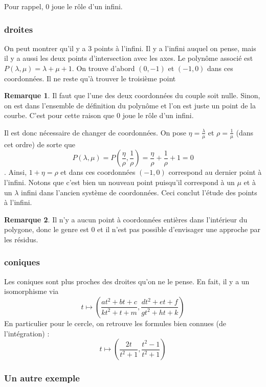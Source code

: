 \documentclass{article}
\theoremstyle{definition} %
\newtheorem{rmq}{Remarque}
\newcommand{\1}{\mathbb{1}} %
\begin{document}
Pour rappel, 0 joue le rôle d'un infini.


\subsubsection{droites}

On peut montrer qu'il y a 3 points à l'infini.
Il y a l'infini auquel on pense, mais il y a aussi les deux points d'intersection avec les axes.
Le polynôme associé est $P(\lambda,\mu)=\lambda + \mu + 1$.
On trouve d'abord $(0,-1)$ et $(-1,0)$ dans ces coordonnées.
Il ne reste qu'à trouver le troisième point

\begin{rmq}
Il faut que l'une des deux coordonnées du couple soit nulle. Sinon, on est dans l'ensemble de définition du polynôme et l'on est juste un point de la courbe.
C'est pour cette raison que 0 joue le rôle d'un infini.
\end{rmq}

Il est donc nécessaire de changer de coordonnées.
On pose  $\eta=\frac{\lambda}{\mu}$ et $\rho= \frac{1}{\mu} $ (dans cet ordre) de sorte que
$$P(\lambda,\mu)=P(\frac{\eta}{\rho},\frac{1}{\rho})=\frac{\eta}{\rho} +\frac{1}{\rho} + 1=0$$.
Ainsi, $1 + \eta =\rho$ et dans ces coordonnées $(-1,0)$ correspond au dernier point à l'infini.
Notons que c'est bien un nouveau point puisqu'il correspond à un $\mu$ et à un $\lambda$ infini dans l'ancien système de coordonnées.
Ceci conclut l'étude des points à l'infini.

\begin{rmq}
Il n'y a aucun point à coordonnées entières dans l'intérieur du polygone, donc le genre est 0 et il n'est pas possible d'envisager une approche par les résidus.
\end{rmq}


\subsubsection{coniques}

Les coniques sont plus proches des droites qu'on ne le pense.
En fait, il y a un isomorphisme via 
$$t \mapsto \left(\frac{at^2 + bt + c}{kt^2 + t + m},\frac{dt^2 + et + f}{gt^2 + ht + k}\right)$$
En particulier pour le cercle, on retrouve les formules bien connues (de l'intégration) :
$$t \mapsto \left(\frac{ 2t}{t^2+1},\frac{t^2-1}{t^2 +1}\right)$$

\subsubsection{Un autre exemple}
\end{document}
